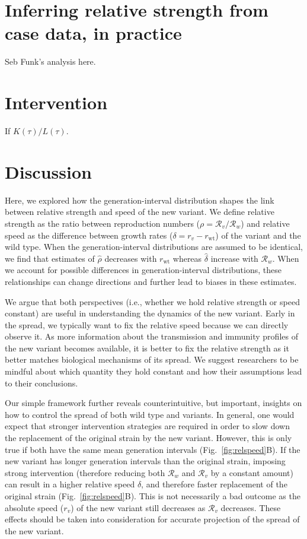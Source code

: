 \documentclass[12pt]{article}
\newcommand{\fref}[1]{Fig.~\ref{fig:#1}}
\newcommand{\rx}[1]{\ensuremath{{r}_{#1}}\xspace}
\newcommand{\ry}[1]{\rx{\mathrm{#1}}}
\newcommand{\rw}{\ry{wt}}
\newcommand{\RR}{\ensuremath{{\mathcal R}}\xspace}
\begin{document}
\section{Inferring relative strength from case data, in practice}

Seb Funk's analysis here.

\section{Intervention}

If $K(\tau)/L(\tau)$.

\section{Discussion}

Here, we explored how the generation-interval distribution shapes the link between relative strength and speed of the new variant.
We define relative strength as the ratio between reproduction numbers ($\rho=\RR_v/\RR_w$) and relative speed as the difference between growth rates ($\delta=r_v-\rw$) of the variant and the wild type.
When the generation-interval distributions are assumed to be identical, we find that estimates of $\hat{\rho}$ decreases with $\rw$ whereas $\hat{\delta}$ increase with $\RR_w$.
When we account for possible differences in generation-interval distributions, these relationships can change directions and further lead to biases in these estimates.

We argue that both perspectives (i.e., whether we hold relative strength or speed constant) are useful in understanding the dynamics of the new variant.
Early in the spread, we typically want to fix the relative speed because we can directly observe it.
As more information about the transmission and immunity profiles of the new variant becomes available, it is better to fix the relative strength as it better matches biological mechanisms of its spread.
We suggest researchers to be mindful about which quantity they hold constant and how their assumptions lead to their conclusions.

Our simple framework further reveals counterintuitive, but important, insights on how to control the spread of both wild type and variants.
In general, one would expect that stronger intervention strategies are required in order to slow down the replacement of the original strain by the new variant.
However, this is only true if both have the same mean generation intervals (\fref{relspeed}B).
If the new variant has longer generation intervals than the original strain, imposing strong intervention (therefore reducing both $\RR_w$ and $\RR_v$ by a constant amount) can result in a higher relative speed $\delta$, and therefore faster replacement of the original strain (\fref{relspeed}B).
This is not necessarily a bad outcome as the absolute speed ($r_v$) of the new variant still decreases as $\RR_v$ decreases.
These effects should be taken into consideration for accurate projection of the spread of the new variant.
\end{document}
